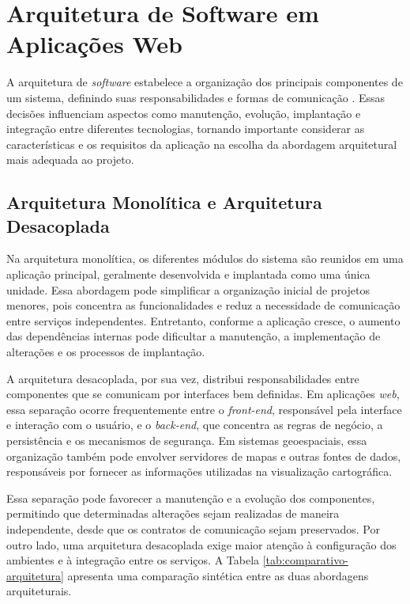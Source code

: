\section{Arquitetura de Software em Aplicações Web}
\label{sec:arquitetura-software}

A arquitetura de \textit{software} estabelece a organização dos principais componentes de um sistema, definindo suas responsabilidades e formas de comunicação \cite{Bass2021}. Essas decisões influenciam aspectos como manutenção, evolução, implantação e integração entre diferentes tecnologias, tornando importante considerar as características e os requisitos da aplicação na escolha da abordagem arquitetural mais adequada ao projeto.

\subsection{Arquitetura Monolítica e Arquitetura Desacoplada}
\label{sec:arquiteturas-web}

Na arquitetura monolítica, os diferentes módulos do sistema são reunidos em uma aplicação principal, geralmente desenvolvida e implantada como uma única unidade. Essa abordagem pode simplificar a organização inicial de projetos menores, pois concentra as funcionalidades e reduz a necessidade de comunicação entre serviços independentes. Entretanto, conforme a aplicação cresce, o aumento das dependências internas pode dificultar a manutenção, a implementação de alterações e os processos de implantação.

A arquitetura desacoplada, por sua vez, distribui responsabilidades entre componentes que se comunicam por interfaces bem definidas. Em aplicações \textit{web}, essa separação ocorre frequentemente entre o \textit{front-end}, responsável pela interface e interação com o usuário, e o \textit{back-end}, que concentra as regras de negócio, a persistência e os mecanismos de segurança. Em sistemas geoespaciais, essa organização também pode envolver servidores de mapas e outras fontes de dados, responsáveis por fornecer as informações utilizadas na visualização cartográfica.

Essa separação pode favorecer a manutenção e a evolução dos componentes, permitindo que determinadas alterações sejam realizadas de maneira independente, desde que os contratos de comunicação sejam preservados. Por outro lado, uma arquitetura desacoplada exige maior atenção à configuração dos ambientes e à integração entre os serviços. A Tabela \ref{tab:comparativo-arquitetura} apresenta uma comparação sintética entre as duas abordagens arquiteturais.


